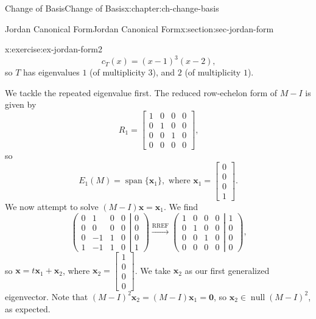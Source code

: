 \documentclass[oneside,10pt,]{book}
\numberwithin{equation}{section}
\newcommand{\spn}{\operatorname{span}}
\newcommand{\bbm}{\begin{bmatrix}}
\newcommand{\ebm}{\end{bmatrix}}
\newcommand{\nll}{\operatorname{null}}
\newcommand{\xx}{\mathbf{x}}
\newcommand{\zer}{\mathbf{0}}
\newcommand{\amp}{&}
\begin{document}
\begin{chapterptx}{Change of Basis}{}{Change of Basis}{}{}{x:chapter:ch-change-basis}
\begin{sectionptx}{Jordan Canonical Form}{}{Jordan Canonical Form}{}{}{x:section:sec-jordan-form}
\begin{inlineexercise}{}{x:exercise:ex-jordan-form2}
\begin{equation*}
c_T(x)=(x-1)^3(x-2)\text{,}
\end{equation*}
so \(T\) has eigenvalues \(1\) (of multiplicity \(3\)), and \(2\) (of multiplicity \(1\)).%
\par
We tackle the repeated eigenvalue first. The reduced row-echelon form of \(M-I\) is given by%
\begin{equation*}
R_1 = \bbm 1\amp 0\amp 0\amp 0\\0\amp 1\amp 0\amp 0\\0\amp 0\amp 1\amp 0\\0\amp 0\amp 0\amp 0\ebm\text{,}
\end{equation*}
so%
\begin{equation*}
E_1(M) = \spn\{\xx_1\}, \text{ where } \xx_1 = \bbm 0\\0\\0\\1\ebm\text{.}
\end{equation*}
We now attempt to solve \((M-I)\xx=\xx_1\). We find%
\begin{equation*}
\left(\begin{matrix}0\amp 1\amp 0\amp 0\\0\amp 0\amp 0\amp 0\\0\amp -1\amp 1\amp 0\\1\amp -1\amp 1\amp 0\end{matrix}\right|\left.\begin{matrix}0\\0\\0\\1\end{matrix}\right)
\xrightarrow{\text{RREF}}
\left(\begin{matrix} 1\amp 0\amp 0\amp 0\\0\amp 1\amp 0\amp 0\\0\amp 0\amp 1\amp 0\\0\amp 0\amp 0\amp 0\end{matrix}\right|\left.\begin{matrix}1\\0\\0\\0\end{matrix}\right)\text{,}
\end{equation*}
so \(\xx = t\xx_1+\xx_2\), where \(\xx_2 = \bbm 1\\0\\0\\0\ebm\). We take \(\xx_2\) as our first generalized eigenvector. Note that \((M-I)^2\xx_2 = (M-I)\xx_1=\zer\), so \(\xx_2\in \nll (M-I)^2\), as expected.%

\end{inlineexercise}
\end{sectionptx}
\end{chapterptx}
\end{document}
